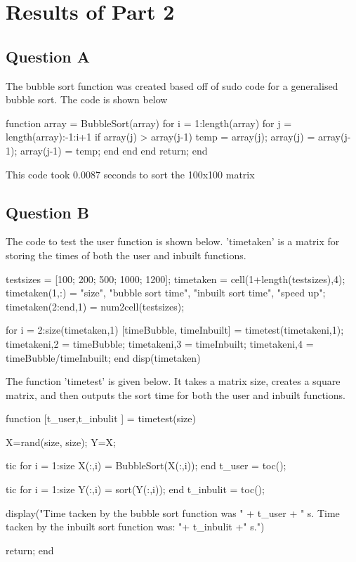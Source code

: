 \section{Results of Part 2}

\subsection{Question A}
The bubble sort function was created based off of sudo code for a generalised bubble sort.
The code is shown below

\begin{Matlab}
 function array = BubbleSort(array)
  for i = 1:length(array)
   for j = length(array):-1:i+1
    if array(j) > array(j-1)
     temp = array(j);
     array(j) = array(j-1);
     array(j-1) = temp;
    end
   end
  end
 return;
 end
\end{Matlab}

This code took 0.0087 seconds to sort the 100x100 matrix

\subsection{Question B}
The code to test the user function is shown below.
'timetaken' is a matrix for storing the times of both the user and inbuilt functions.

\begin{Matlab}
 testsizes = [100; 200; 500; 1000; 1200];
 timetaken = cell(1+length(testsizes),4);
 timetaken(1,:) = {"size", "bubble sort time", "inbuilt sort time", "speed up"};
 timetaken(2:end,1) = num2cell(testsizes); %

 for i = 2:size(timetaken,1)
  [timeBubble, timeInbuilt] = timetest(timetaken{i,1});
  timetaken{i,2} = timeBubble;
  timetaken{i,3} = timeInbuilt;
  timetaken{i,4} = timeBubble/timeInbuilt;
 end
 disp(timetaken)
\end{Matlab}

The function 'timetest' is given below.
It takes a matrix size, creates a square matrix, and then outputs the sort time for both the user and inbuilt functions.

\begin{Matlab}
 function [t_user,t_inbulit ] = timetest(size)

  X=rand(size, size);
  Y=X;

  tic
  for i = 1:size
   X(:,i) = BubbleSort(X(:,i));
  end
  t_user = toc();

  tic
  for i = 1:size
   Y(:,i) = sort(Y(:,i));
  end
  t_inbulit = toc();

  display("Time tacken by the bubble sort function was " + t_user + " s. Time tacken by the inbuilt sort function was: "+  t_inbulit +" s.")

  return;
 end
\end{Matlab}

